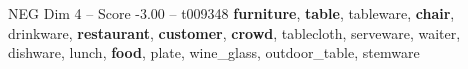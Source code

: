 \begin{textsample}{NEG Dim 4 – Score -3.00 – t009348}  \label{ex:f4_neg_005}
\textbf{furniture}, \textbf{table}, tableware, \textbf{chair}, drinkware, \textbf{restaurant}, \textbf{customer}, \textbf{crowd}, tablecloth, serveware, waiter, dishware, lunch, \textbf{food}, plate, wine\_glass, outdoor\_table, stemware

\end{textsample}
